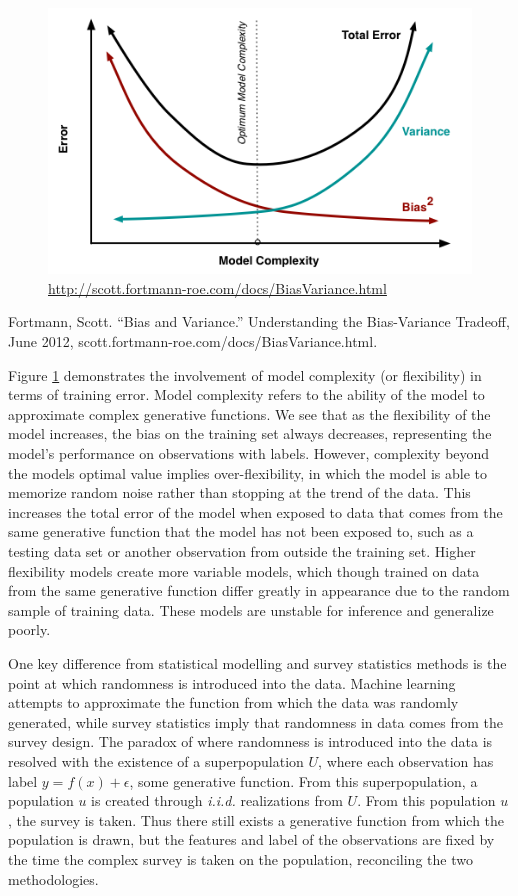 \documentclass[12pt,twoside]{reedthesis}
\begin{document}
\begin{figure}
\centering
\includegraphics{figure/biasvariance.png}
\caption{\label{fig:biasvar}\url{http://scott.fortmann-roe.com/docs/BiasVariance.html}}
\end{figure}
Fortmann, Scott. ``Bias and Variance.'' Understanding the Bias-Variance
Tradeoff, June 2012, scott.fortmann-roe.com/docs/BiasVariance.html.

Figure \ref{fig:biasvar} demonstrates the involvement of model
complexity (or flexibility) in terms of training error. Model complexity
refers to the ability of the model to approximate complex generative
functions. We see that as the flexibility of the model increases, the
bias on the training set always decreases, representing the model's
performance on observations with labels. However, complexity beyond the
models optimal value implies over-flexibility, in which the model is
able to memorize random noise rather than stopping at the trend of the
data. This increases the total error of the model when exposed to data
that comes from the same generative function that the model has not been
exposed to, such as a testing data set or another observation from
outside the training set. Higher flexibility models create more variable
models, which though trained on data from the same generative function
differ greatly in appearance due to the random sample of training data.
These models are unstable for inference and generalize poorly.

One key difference from statistical modelling and survey statistics
methods is the point at which randomness is introduced into the data.
Machine learning attempts to approximate the function from which the
data was randomly generated, while survey statistics imply that
randomness in data comes from the survey design. The paradox of where
randomness is introduced into the data is resolved with the existence of
a superpopulation \(U\), where each observation has label
\(y = f(x) + \epsilon\), some generative function. From this
superpopulation, a population \(u\) is created through \emph{i.i.d.}
realizations from \(U\). From this population \(u\), the survey is
taken. Thus there still exists a generative function from which the
population is drawn, but the features and label of the observations are
fixed by the time the complex survey is taken on the population,
reconciling the two methodologies.
\end{document}
